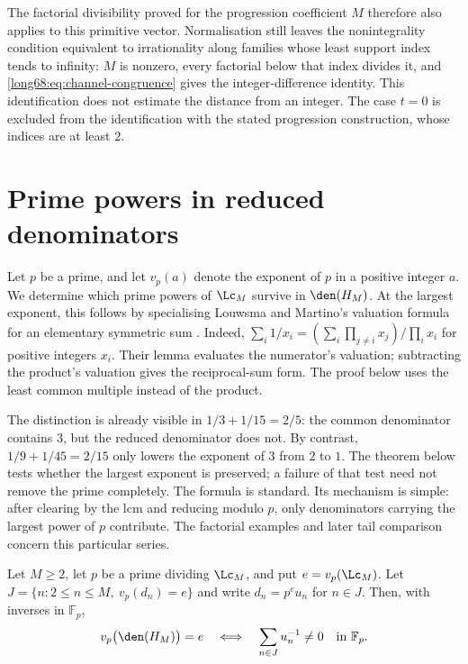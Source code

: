 The factorial divisibility proved for the progression coefficient $M$ therefore
also applies to this primitive vector. Normalisation still leaves the
nonintegrality condition equivalent to irrationality along families
whose least support index tends to infinity: $M$ is nonzero,
every factorial below that index divides it, and
\eqref{long68:eq:channel-congruence} gives the integer-difference identity.
This identification does not estimate the distance from an integer.
The case $t=0$ is excluded from the identification with the stated
progression construction, whose indices are at least $2$.

\section{Prime powers in reduced denominators}\label{long68:sec:prime-powers}

Let $p$ be a prime, and let $v_p(a)$ denote the exponent of $p$ in a
positive integer $a$. We determine which prime powers of $\Lc_M$ survive in $\den(H_M)$.
At the largest exponent, this follows by specialising Louwsma and
Martino's valuation formula
for an elementary symmetric sum \cite[Lemma~4.1, p.~10]{louwsma-martino}.
Indeed, $\sum_i1/x_i=(\sum_i\prod_{j\ne i}x_j)/\prod_i x_i$ for positive
integers $x_i$. Their lemma evaluates the numerator's valuation; subtracting
the product's valuation gives the reciprocal-sum form. The proof below
uses the least common multiple instead of the product.

The distinction is already visible in $1/3+1/15=2/5$:
the common denominator contains $3$, but the reduced denominator does not.
By contrast, $1/9+1/45=2/15$ only lowers the exponent of $3$ from $2$ to $1$.
The theorem below tests whether the largest exponent is preserved; a
failure of that test need not remove the prime completely. The formula
is standard. Its mechanism is simple: after clearing by the lcm and
reducing modulo $p$, only denominators carrying the largest power of
$p$ contribute. The factorial examples and later tail comparison
concern this particular series.

\label{long68:res:lead-prime-pole}
\begin{theorem}\label{long68:res:prime-pole}
Let $M\ge2$, let $p$ be a prime dividing $\Lc_M$, and put $e=v_p(\Lc_M)$.
Let $J=\{n:2\le n\le M,\ v_p(d_n)=e\}$ and write $d_n=p^eu_n$ for $n\in J$.
Then, with inverses in $\mathbb F_p$,
\begin{equation}\label{long68:eq:prime-pole-survival}
 v_p\bigl(\den(H_M)\bigr)=e
 \quad\Longleftrightarrow\quad
 \sum_{n\in J}u_n^{-1}\ne0\quad\hbox{in }\mathbb F_p.
\end{equation}
\end{theorem}

